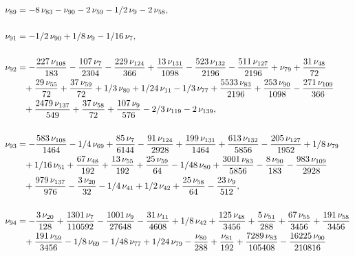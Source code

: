 \documentclass[a4paper,12pt, DIV=14, BCOR=5mm, twoside, headsepline]{scrbook}
\begin{document}
\begin{align}\label{AreaSol8}
\begin{aligned}
\nu_{{89}}&=-8\,\nu_{{83}}-\nu_{{90}}-2\,
\nu_{{59}}-1/2\,\nu_{{9}}-2\,\nu_{{58}}, \\
\\
\nu_{{91}}&=-1/2\,\nu_{{90}}+1/
8\,\nu_{{9}}-1/16\,\nu_{{7}}, \\
\\
\nu_{{92}}&=-{\frac {227\,\nu_{{108}}}{183
}}-{\frac {107\,\nu_{{7}}}{2304}}-{\frac {229\,\nu_{{124}}}{366}}+{
\frac {13\,\nu_{{131}}}{1098}}-{\frac {523\,\nu_{{132}}}{2196}}-{
\frac {511\,\nu_{{127}}}{2196}}+\nu_{{79}}+{\frac {31\,\nu_{{48}}}{72}
}\\
 &\hphantom{=}+{\frac {29\,\nu_{{55}}}{72}}+{\frac {37\,\nu_{{59}}}{72}}+1/3\,\nu_{
{80}}+1/24\,\nu_{{11}}-1/3\,\nu_{{77}}+{\frac {5533\,\nu_{{83}}}{2196}
}+{\frac {253\,\nu_{{90}}}{1098}}-{\frac {271\,\nu_{{109}}}{366}}\\
 &\hphantom{=}+{
\frac {2479\,\nu_{{137}}}{549}}+{\frac {37\,\nu_{{58}}}{72}}+{\frac {
107\,\nu_{{9}}}{576}}-2/3\,\nu_{{119}}-2\,\nu_{{139}}, \\
\\
\nu_{{93}}&=-{
\frac {583\,\nu_{{108}}}{1464}}-1/4\,\nu_{{69}}+{\frac {85\,\nu_{{7}}
}{6144}}-{\frac {91\,\nu_{{124}}}{2928}}+{\frac {199\,\nu_{{131}}}{
1464}}+{\frac {613\,\nu_{{132}}}{5856}}-{\frac {205\,\nu_{{127}}}{1952
}}+1/8\,\nu_{{79}}\\
 &\hphantom{=}+1/16\,\nu_{{51}}+{\frac {67\,\nu_{{48}}}{192}}+{
\frac {13\,\nu_{{55}}}{192}}+{\frac {25\,\nu_{{59}}}{64}}-1/48\,\nu_{{
80}}+{\frac {3001\,\nu_{{83}}}{5856}}-{\frac {8\,\nu_{{90}}}{183}}-{
\frac {983\,\nu_{{109}}}{2928}}\\
 &\hphantom{=}+{\frac {979\,\nu_{{137}}}{976}}-{
\frac {3\,\nu_{{20}}}{32}}-1/4\,\nu_{{41}}+1/2\,\nu_{{42}}+{\frac {25
\,\nu_{{58}}}{64}}-{\frac {23\,\nu_{{9}}}{512}}, \\
\\
\nu_{{94}}&=-{\frac {3
\,\nu_{{20}}}{128}}+{\frac {1301\,\nu_{{7}}}{110592}}-{\frac {1001\,
\nu_{{9}}}{27648}}-{\frac {31\,\nu_{{11}}}{4608}}+1/8\,\nu_{{42}}+{
\frac {125\,\nu_{{48}}}{3456}}+{\frac {5\,\nu_{{51}}}{288}}+{\frac {67
\,\nu_{{55}}}{3456}}+{\frac {191\,\nu_{{58}}}{3456}}\\
 &\hphantom{=}+{\frac {191\,\nu_
{{59}}}{3456}}-1/8\,\nu_{{69}}-1/48\,\nu_{{77}}+1/24\,\nu_{{79}}-{
\frac {\nu_{{80}}}{288}}+{\frac {\nu_{{81}}}{192}}+{\frac {7289\,\nu_{
{83}}}{105408}}-{\frac {16225\,\nu_{{90}}}{210816}}\\

\end{aligned}
\end{align}
\end{document}
